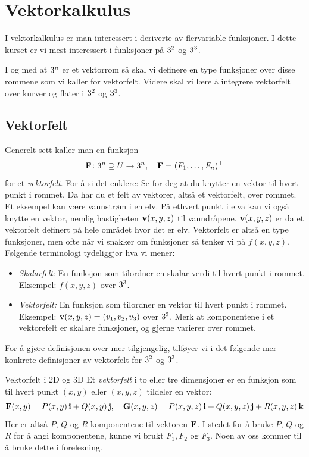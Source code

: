 \chapter{Vektorkalkulus}
\label{chap:VektorKalk}
I vektorkalkulus er man interessert i deriverte av flervariable funksjoner. I dette kurset er vi mest interessert i funksjoner på $3^2$ og $3^3$. 

I og med at $3^n$ er et vektorrom så skal vi definere en type funksjoner over disse rommene som vi kaller for vektorfelt. Videre skal vi lære å integrere vektorfelt over kurver og flater i $3^2$ og $3^3$.

\section{Vektorfelt}
Generelt sett kaller man en funksjon 
\[\mathbf{F} \colon 3^n \supseteq U \rightarrow 3^n, \quad \mathbf{F}=(F_1,\ldots, F_n)^\top\] for et \emph{vektorfelt}. 
For å si det enklere: Se for deg at du knytter en vektor til hvert punkt i rommet. Da har du et felt av vektorer, altså et vektorfelt, over rommet. Et eksempel kan være vannstrøm i en elv. På ethvert punkt i elva kan vi også knytte en vektor, nemlig hastigheten $\mathbf{v}(x,y,z)$ til vanndråpene. $\mathbf{v}(x,y,z)$ er da et vektorfelt definert på hele området hvor det er elv. Vektorfelt er altså en type funksjoner, men ofte når vi snakker om funksjoner så tenker vi på $f(x,y,z)$. Følgende terminologi tydeliggjør hva vi mener:
\begin{itemize}
    \item \textit{Skalarfelt}: En funksjon som tilordner en skalar verdi til hvert punkt i rommet. Eksempel: $f(x,y,z)$ over $3^3$.
    \item \textit{Vektorfelt:} En funksjon som tilordner en vektor til hvert punkt i rommet. Eksempel: $\mathbf{v}(x,y,z)=(v_1,v_2,v_3)$ over $3^3$. Merk at komponentene i et vektorefelt er skalare funksjoner, og gjerne varierer over rommet.
\end{itemize}

For å gjøre definisjonen over mer tilgjengelig, tilføyer vi i det følgende mer konkrete definisjoner av vektorfelt for $3^2$ og $3^3$.

\begin{defn}{Vektorfelt i 2D og 3D}
Et \emph{vektorfelt} i to eller tre dimensjoner er en funksjon som til hvert punkt $(x, y)$ eller $(x, y, z)$ tildeler en vektor:
\[
\mathbf{F}(x, y) = P(x, y)\,\mathbf{i} + Q(x, y)\,\mathbf{j}, \quad
\mathbf{G}(x, y, z) = P(x, y, z)\,\mathbf{i} + Q(x, y, z)\,\mathbf{j} + R(x, y, z)\,\mathbf{k}
\]
Her er altså $P$, $Q$ og $R$ komponentene til vektoren $\mathbf{F}$. I stedet for å bruke $P$, $Q$ og $R$ for å angi komponentene, kunne vi brukt $F_1,F_2$ og $F_3$. Noen av oss kommer til å bruke dette i forelesning.
\end{defn}

